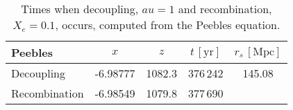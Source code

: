 \begin{table}[h]
\centering
\caption{Times when decoupling, $	au=1$ and recombination, $X_e=0.1$, occurs, computed from the Peebles equation.}
\label{tab:M2:results:rec_and_dec_time_table_Peebles}
\begin{tabular}{l|cccc}
\toprule
      Peebles &      $x$ &    $z$ & $t\,\mathrm{[yr]}$ & $r_s \,\mathrm{[Mpc]}$ \\
\midrule
   Decoupling & -6.98777 & 1082.3 &           376\,242 &                 145.08 \\
Recombination & -6.98549 & 1079.8 &           377\,690 &                        \\
\bottomrule
\end{tabular}
\end{table}
